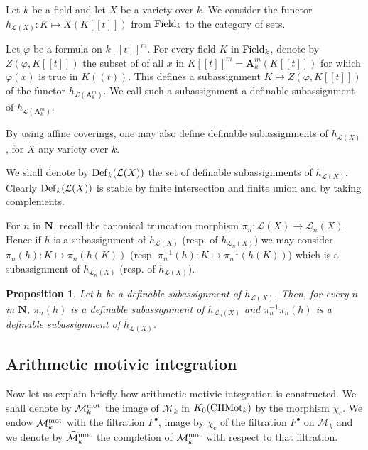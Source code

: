 \documentclass[english,12pt]{amsart}
\def\AA{{\mathbf A}}
\def\NN{{\mathbf N}}
\def\cL{{\mathcal L}}
\def\cM{{\mathcal M}}
\newtheorem{prop}[subsubsection]{Proposition}
\theoremstyle{definition}
\theoremstyle{remark}
\theoremstyle{plain}
\numberwithin{equation}{subsection}
\def\AA{{\mathbf A}}
\def\NN{{\mathbf N}}
\def\cL{{\mathcal L}}
\def\cM{{\mathcal M}}
\begin{document}
Let $k$ be a field
and let $X$ be a variety over $k$. 
We consider the functor
$h_{\cL (X)} :  K \mapsto X (K[[t]])$ from ${\rm Field}_{k}$
to the category of sets.

Let $\varphi$ be a formula on $k [[t]]^m$.
For every field $K$ in ${\rm Field}_{k}$, denote by 
$Z (\varphi, K[[t]]) $ the subset of
of all $x$ in
$K[[t]]^{m} = \AA^{m}_{k} (K [[t]])$
for which  $\varphi (x)$ is true
in $K((t))$.
This defines a subassignment
$K \mapsto Z (\varphi, K[[t]]) $
of the functor $h_{\cL (\AA^{m}_{k})}$.
We call such a subassignment a definable subassignment of 
$h_{\cL (\AA^{m}_{k})}$.

By using affine coverings, one may also define
definable subassignments of $h_{\cL (X)}$, for
$X$ any variety over $k$.








We shall denote by ${\rm Def}_{k} (\cL (X))$ the set of
definable subassignments of $h_{\cL (X)}$. Clearly ${\rm Def}_{k} (\cL
(X))$ is stable
by finite intersection and finite union and by taking complements.




For $n$ in $\NN$, recall the  canonical truncation 
morphism $\pi_{n} : \cL (X) \rightarrow \cL_{n} (X)$.
Hence if $h$ is a subassignment of $h_{\cL(X)}$ 
(resp. of $h_{\cL_{n} (X)}$)
we may consider
$\pi_{n} (h) : K \mapsto \pi_{n} (h (K))$
(resp. $\pi_{n}^{-1} (h) : K \mapsto \pi_{n}^{-1} (h (K))$)
which is a subassignment of $h_{\cL_{n} (X)}$
(resp. of $h_{\cL (X)}$).



\begin{prop}\label{speci}Let $h$ be  a definable
subassignment of $h_{\cL(X)}$. Then, for every 
$n$ in $\NN$, 
$\pi_{n} (h)$ is a definable
subassignment of $h_{\cL_{n} (X)}$ 
and
$\pi_{n}^{-1} \pi_{n} (h)$ is a definable
subassignment of $h_{\cL (X)}$.
\end{prop}


\subsection{Arithmetic motivic integration}Now let us explain briefly how arithmetic motivic integration
is constructed.
We shall denote by $\cM^{\rm mot}_k$
the image of 
$\cM_k$
in
$K_0 ({\rm CHMot}_k)$ by the morphism $\chi_c$.
We endow $\cM^{\rm mot}_k$ with the filtration $F^{\bullet}$,
image by $\chi_c$ of the filtration $F^{\bullet}$ on $\cM_k$
and we denote by $\widehat \cM^{\rm mot}_k$ the completion of
$\cM^{\rm mot}_k$ with respect to that filtration.
\end{document}

